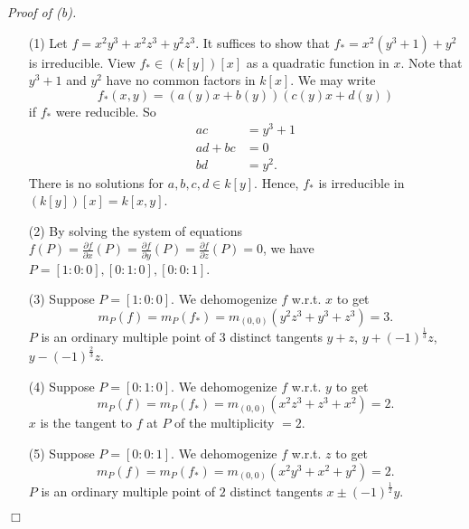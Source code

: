 \documentclass{article}
\begin{document}
\emph{Proof of (b).}
\begin{enumerate}
\item[(1)]
  Let $f = x^2y^3 + x^2z^3 + y^2z^3$.
  It suffices to show that $f_{*} = x^2(y^3+1) + y^2$ is irreducible.
  View $f_{*} \in (k[y])[x]$ as a quadratic function in $x$.
  Note that $y^3+1$ and $y^2$ have no common factors in $k[x]$.
  We may write
  \[
    f_{*}(x,y) = (a(y) x + b(y))(c(y) x + d(y))
  \]
  if $f_{*}$ were reducible.
  So
  \begin{align*}
    ac &= y^3+1 \\
    ad+bc &= 0 \\
    bd &= y^2.
  \end{align*}
  There is no solutions for $a, b, c, d \in k[y]$.
  Hence, $f_{*}$ is irreducible in $(k[y])[x] = k[x,y]$.

\item[(2)]
  By solving the system of equations
  $f(P)
  = \frac{\partial f}{\partial x}(P)
  = \frac{\partial f}{\partial y}(P)
  = \frac{\partial f}{\partial z}(P) = 0$,
  we have
  $P = [1:0:0], [0:1:0], [0:0:1]$.

\item[(3)]
  Suppose $P = [1:0:0]$.
  We dehomogenize $f$ w.r.t. $x$ to get
  \[
    m_P(f) = m_P(f_{*}) = m_{(0,0)}(y^2z^3 + y^3 + z^3) = 3.
  \]
  $P$ is an ordinary multiple point of $3$ distinct tangents
  $y + z$, $y + (-1)^{\frac{1}{3}}z$, $y - (-1)^{\frac{2}{3}}z$.

\item[(4)]
  Suppose $P = [0:1:0]$.
  We dehomogenize $f$ w.r.t. $y$ to get
  \[
    m_P(f) = m_P(f_{*}) = m_{(0,0)}(x^2z^3 + z^3 + x^2) = 2.
  \]
  $x$ is the tangent to $f$ at $P$ of the multiplicity $= 2$.

\item[(5)]
  Suppose $P = [0:0:1]$.
  We dehomogenize $f$ w.r.t. $z$ to get
  \[
    m_P(f) = m_P(f_{*}) = m_{(0,0)}(x^2y^3 + x^2 + y^2) = 2.
  \]
  $P$ is an ordinary multiple point of $2$ distinct tangents
  $x \pm (-1)^{\frac{1}{2}}y$.
\end{enumerate}
$\Box$ \\
\end{document}
